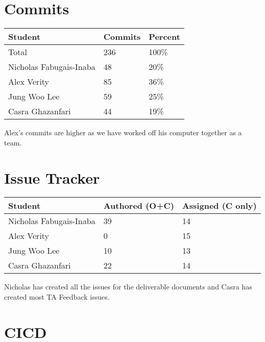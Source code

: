 \documentclass{article}
\begin{document}
\section{Commits}

\begin{table}[H]
\centering
\begin{tabular}{lll}
\toprule
\textbf{Student} & \textbf{Commits} & \textbf{Percent}\\
\midrule
Total & 236 & 100\% \\
Nicholas Fabugais-Inaba & 48 & 20\% \\
Alex Verity & 85 & 36\% \\
Jung Woo Lee & 59 & 25\% \\
Casra Ghazanfari & 44 & 19\% \\
\bottomrule
\end{tabular}
\end{table}

Alex's commits are higher as we have worked off his computer together as a team.

\section{Issue Tracker}

\begin{table}[H]
\centering
\begin{tabular}{lll}
\toprule
\textbf{Student} & \textbf{Authored (O+C)} & \textbf{Assigned (C only)}\\
\midrule
Nicholas Fabugais-Inaba & 39 & 14 \\
Alex Verity & 0 & 15 \\
Jung Woo Lee & 10 & 13 \\
Casra Ghazanfari & 22 & 14 \\
\bottomrule
\end{tabular}
\end{table}

Nicholas has created all the issues for the deliverable documents and Casra has created
most TA Feedback issues.

\section{CICD}
\end{document}

